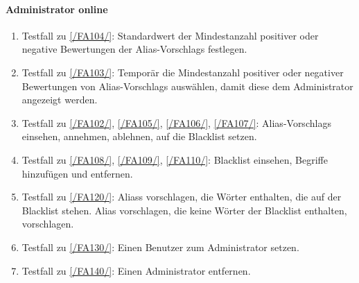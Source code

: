 \paragraph{\Gls{Administrator} online}
\begin{enumerate}[label=\textbf{/T\arabic*0/}, align=left, resume]
	\item \label{/T260/} Testfall zu \ref{/FA104/}: Standardwert der Mindestanzahl positiver oder negative Bewertungen der \Glspl{Alias-Vorschlag} festlegen.
	\item \label{/T270/} Testfall zu \ref{/FA103/}: Temporär die Mindestanzahl positiver oder negativer Bewertungen von \Glspl{Alias-Vorschlag} auswählen, damit diese dem \Gls{Administrator} angezeigt werden.
	\item \label{/T280/} Testfall zu \ref{/FA102/}, \ref{/FA105/}, \ref{/FA106/}, \ref{/FA107/}: \Glspl{Alias-Vorschlag} einsehen, annehmen, ablehnen, auf die \Gls{Blacklist} setzen.
	\item \label{/T290/} Testfall zu \ref{/FA108/}, \ref{/FA109/}, \ref{/FA110/}: \Gls{Blacklist} einsehen, Begriffe hinzufügen und entfernen.
	\item \label{/T300/} Testfall zu \ref{/FA120/}: \Glspl{Alias} vorschlagen, die Wörter enthalten, die auf der \Gls{Blacklist} stehen. \Gls{Alias} vorschlagen, die keine Wörter der \Gls{Blacklist} enthalten, vorschlagen.
	\item \label{/T310/} Testfall zu \ref{/FA130/}: Einen \Gls{Benutzer} zum \Gls{Administrator} setzen.
	\item \label{/T320/} Testfall zu \ref{/FA140/}: Einen \Gls{Administrator} entfernen.
\end{enumerate}
